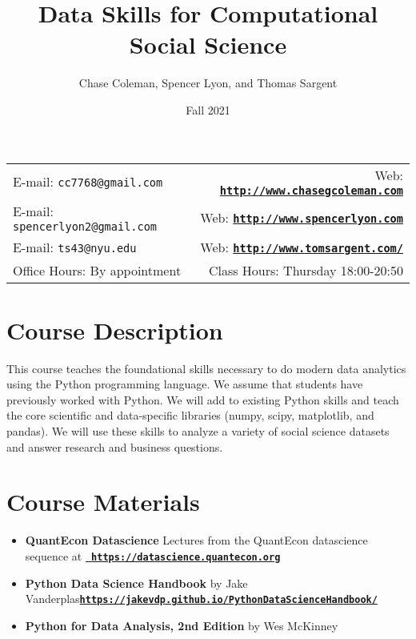 \documentclass[11pt]{article}
\title{Data Skills for Computational Social Science}
\author{Chase Coleman, Spencer Lyon, and Thomas Sargent}
\date{Fall 2021}
\newcommand{\blankline}{\quad\pagebreak[2]}
\begin{document}
\maketitle

\blankline

\begin{tabular*}{.93\textwidth}{@{\extracolsep{\fill}}lr}

  E-mail: \texttt{cc7768@gmail.com} & Web: \href{http://www.chasegcoleman.com}{\tt\bf http://www.chasegcoleman.com}  \\
  E-mail: \texttt{spencerlyon2@gmail.com} & Web: \href{http://www.spencerlyon.com}{\tt\bf http://www.spencerlyon.com}  \\
  E-mail: \texttt{ts43@nyu.edu} & Web: \href{http://www.tomsargent.com/}{\tt\bf http://www.tomsargent.com/}  \\

  Office Hours: By appointment  &  Class Hours: Thursday 18:00-20:50 \\

  \hline

\end{tabular*}

\vspace{5 mm}


%
%
\section*{Course Description}

  This course teaches the foundational skills necessary to do modern data
  analytics using the Python programming language. We assume that students have
  previously worked with Python. We will add to existing Python skills and teach
  the core scientific and data-specific libraries (numpy, scipy, matplotlib, and
  pandas). We will use these skills to analyze a variety of social science
  datasets and answer research and business questions.

%
%
\section*{Course Materials}

  \begin{itemize}
    \item {\bf QuantEcon Datascience} Lectures from the QuantEcon datascience
    sequence at \newline\href{https://datascience.quantecon.org}{\tt\bf
    https://datascience.quantecon.org}
    \item {\bf Python Data Science Handbook} by Jake Vanderplas\newline\href{https://jakevdp.github.io/PythonDataScienceHandbook/}{\tt\bf https://jakevdp.github.io/PythonDataScienceHandbook/}
    \item {\bf Python for Data Analysis, 2nd Edition} by Wes McKinney
  \end{itemize}
\end{document}

